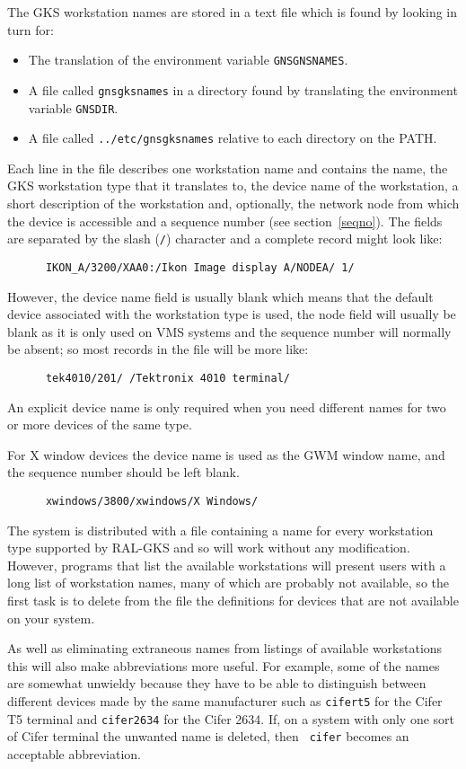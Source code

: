 \documentclass[twoside,11pt]{article}
\newcommand{\hyperref}[4]{#2\ref{#4}#3}
\renewcommand{\_}{\texttt{\symbol{95}}}
\begin{document}
The GKS workstation names are stored in a text file which is found by looking
in turn for:
\begin{itemize}
\item The translation of the environment variable {\tt GNS\_GNSNAMES}.
\item A file called {\tt gns\_gksnames} in a directory found by
translating the environment variable {\tt GNS\_DIR}.
\item A file called {\tt ../etc/gns\_gksnames} relative to each directory
on the PATH.
\end{itemize}
Each line in the file describes one workstation name
and contains the name, the GKS workstation type that it translates to, the
device name of the workstation, a short description of the workstation and,
optionally, the network node from which the device is accessible and a
sequence number (see \hyperref{this section}{section~}{}{seqno}). The
fields are separated by the slash ({\tt/}) character and a complete record
might look like:
\begin{verbatim}
      IKON_A/3200/XAA0:/Ikon Image display A/NODEA/ 1/
\end{verbatim}
However, the device name field is usually blank which means that the
default device associated with the workstation type is used, the node field
will usually be blank as it is only used on VMS systems
and the sequence number will normally be absent;
so most records in the file will be more like:
\begin{verbatim}
      tek4010/201/ /Tektronix 4010 terminal/
\end{verbatim}
An explicit device name is only required when you need different names for two
or more devices of the same type.

For X window devices the device name is used as the GWM window name, and the
sequence number should be left blank.
\begin{verbatim}
      xwindows/3800/xwindows/X Windows/
\end{verbatim}

The system is distributed with a file containing a name for every workstation
type supported by RAL-GKS and so will work without any modification. However,
programs that list the available workstations will
present users with a long list of workstation names, many of which
are probably not available, so the first task is to delete from the
file the definitions for devices that are not available on your system.

As well as eliminating extraneous names from listings of available workstations
this will also make abbreviations more useful. For example, some of the
names are somewhat unwieldy because they have to be able to distinguish between
different devices made by the same manufacturer such as {\tt cifer\_t5} for the
Cifer T5 terminal and {\tt cifer\_2634} for the Cifer 2634. If, on a system with
only one sort of Cifer terminal the unwanted name is deleted, then {\tt
cifer} becomes an acceptable abbreviation.
\end{document}
